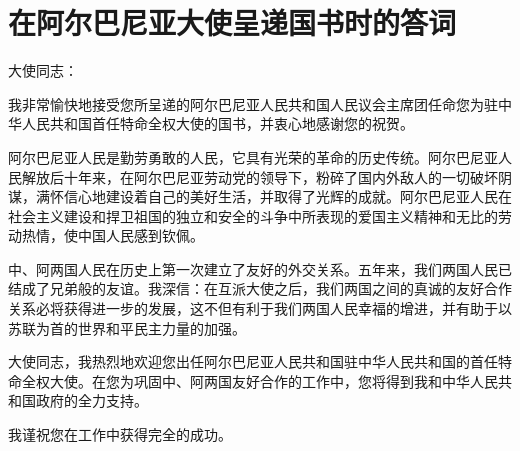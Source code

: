 \section[在阿尔巴尼亚大使呈递国书时的答词（一九五四年九月十三日）]{在阿尔巴尼亚大使呈递国书时的答词}


大使同志：

我非常愉快地接受您所呈递的阿尔巴尼亚人民共和国人民议会主席团任命您为驻中华人民共和国首任特命全权大使的国书，并衷心地感谢您的祝贺。

阿尔巴尼亚人民是勤劳勇敢的人民，它具有光荣的革命的历史传统。阿尔巴尼亚人民解放后十年来，在阿尔巴尼亚劳动党的领导下，粉碎了国内外敌人的一切破坏阴谋，满怀信心地建设着自己的美好生活，并取得了光辉的成就。阿尔巴尼亚人民在社会主义建设和捍卫祖国的独立和安全的斗争中所表现的爱国主义精神和无比的劳动热情，使中国人民感到钦佩。

中、阿两国人民在历史上第一次建立了友好的外交关系。五年来，我们两国人民已结成了兄弟般的友谊。我深信：在互派大使之后，我们两国之间的真诚的友好合作关系必将获得进一步的发展，这不但有利于我们两国人民幸福的增进，并有助于以苏联为首的世界和平民主力量的加强。

大使同志，我热烈地欢迎您出任阿尔巴尼亚人民共和国驻中华人民共和国的首任特命全权大使。在您为巩固中、阿两国友好合作的工作中，您将得到我和中华人民共和国政府的全力支持。

我谨祝您在工作中获得完全的成功。


